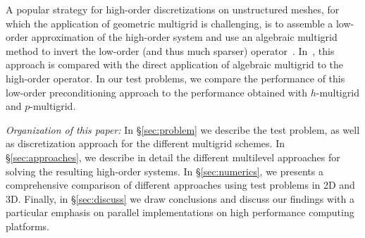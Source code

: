 \documentclass[smallcondensed,final]{svjour3}     %
\newcommand{\gsnote}[1]{\textcolor{blue}{GS: #1}}
\begin{document}

A popular strategy for high-order discretizations on unstructured meshes, for
which the application of geometric multigrid is challenging, is to assemble a
low-order approximation of the high-order system and use an algebraic multigrid
method to invert the low-order (and thus much sparser) operator~\cite{Brown10,
Kim07, DevilleMund90, Olson07, CanutoGervasioQuarteroni10}.
In~\cite{HeysManteuffelMcCormickEtAl05}, this approach is compared with the
direct application of algebraic multigrid to the high-order operator.  In our
test problems, we compare the performance of this low-order preconditioning
approach to the performance obtained with $h$-multigrid and $p$-multigrid.


{\em Organization of this paper:} In \S\ref{sec:problem} we describe
the test problem, as well as discretization approach for the different
multigrid schemes. In \S\ref{sec:approaches}, we describe in detail
the different multilevel approaches for solving the resulting
high-order systems. In \S\ref{sec:numerics}, we presents a
comprehensive comparison of different approaches using test problems
in 2D and 3D. Finally, in \S\ref{sec:discuss} we draw conclusions and
discuss our findings with a particular emphasis on parallel
implementations on high performance computing platforms.



\end{document}
